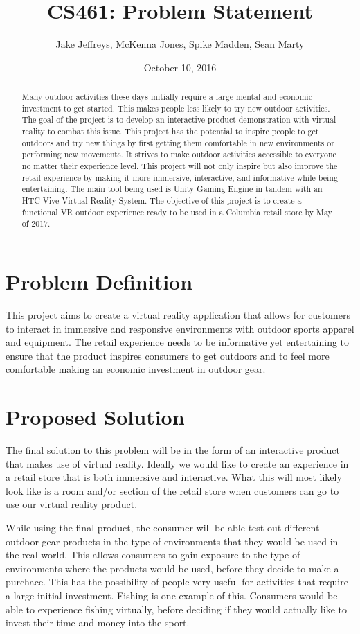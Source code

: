 \documentclass[letterpaper,10pt,titlepage]{article}
\title{CS461: Problem Statement}
\author{Jake Jeffreys, McKenna Jones, Spike Madden, Sean Marty}
\date{October 10, 2016}
\begin{document}
\begin{titlepage}
\maketitle
\begin{abstract}
Many outdoor activities these days initially require a large mental and economic
investment to get started. This makes people less likely to try new outdoor
activities. The goal of the project is to develop an interactive product
demonstration with virtual reality to combat this issue. This project has the
potential to inspire people to get outdoors and try new things by first getting
them comfortable in new environments or performing new movements. It strives to
make outdoor activities accessible to everyone no matter their experience level.
This project will not only inspire but also improve the retail experience by
making it more immersive, interactive, and informative while being
entertaining. The main tool being used is Unity Gaming Engine in tandem with an
HTC Vive Virtual Reality System. The objective of this project is to create a
functional VR outdoor experience ready to be used in a Columbia retail store by
May of 2017.
\end{abstract}
\end{titlepage}

\section{Problem Definition}
This project aims to create a virtual reality application that allows for customers to interact in immersive and responsive environments with outdoor sports apparel and equipment. The retail experience needs to be informative yet entertaining to ensure that the product inspires consumers to get outdoors and to feel more comfortable making an economic investment in outdoor gear.

\section{Proposed Solution}
The final solution to this problem will be in the form of an interactive product that makes use of virtual reality. Ideally we would like to create an experience in a retail store that is both immersive and interactive. What this will most likely look like is a room and/or section of the retail store when customers can go to use our virtual reality product.

While using the final product, the consumer will be able test out different outdoor gear products in the type of environments that they would be used in the real world. This allows consumers to gain exposure to the type of environments where the products would be used, before they decide to make a purchace. This has the possibility of people very useful for activities that require a large initial investment. Fishing is one example of this. Consumers would be able to experience fishing virtually, before deciding if they would actually like to invest their time and money into the sport.
\end{document}
